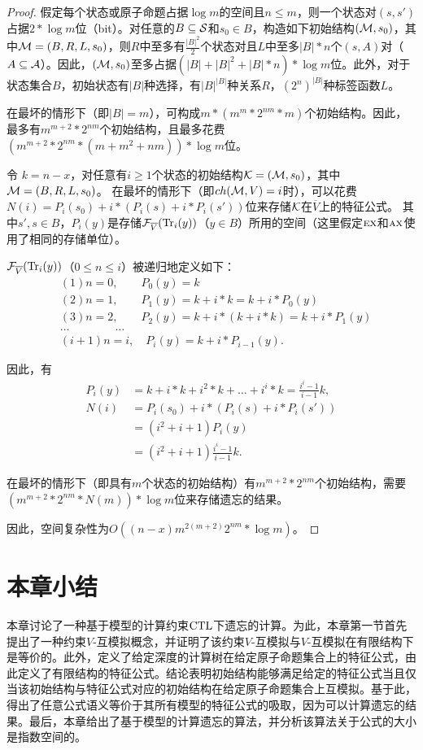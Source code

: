 \begin{proof}
假定每个状态或原子命题占据$\log m$的空间且$n\leq m$，则一个状态对$(s,s')$占据$2*\log m$位（bit）。对任意的$B \subseteq {\cal S}$和$s_0\in B$，构造如下初始结构$({\cal M},s_0)$，其中${\cal M} = (B,R,L,s_0)$，则$R$中至多有$\frac{|B|^2}{2}$个状态对且$L$中至多$|B|*n$个$(s,A)$对（$A\subseteq {\cal A}$）。因此，$({\cal M},s_0)$至多占据$(|B|+|B|^2+|B|*n)*\log m$位。此外，对于状态集合$B$，初始状态有$|B|$种选择，有$|B|^{|B|}$种关系$R$，$(2^n)^{|B|}$种标签函数$L$。

在最坏的情形下（即$|B|=m$），可构成$m * (m^m * 2^{nm} * m)$个初始结构。因此，最多有$m^{m+2} * 2^{nm}$个初始结构，且最多花费$(m^{m+2} * 2^{nm} * (m + m^2 + nm))* \log m$位。

令 $k = n-x$，对任意有$i\geq 1$个状态的初始结构${\cal K} = ({\cal M},s_0)$，其中${\cal M} = (B,R,L,s_0)$。
在最坏的情形下（即$ch({\cal M},V) = i$时），可以花费$N(i) = P_i(s_0) + i * (P_i(s) + i *P_i(s'))$位来存储${\cal K}$在$\overline{V}$上的特征公式。
其中$s',s\in B$，$P_i(y)$是存储${\cal F}_{\overline{V}}(\textrm{Tr}_i(y))$（$y\in B$）所用的空间（这里假定$\textsc{e}\textsc{x}$和$\textsc{a}\textsc{x}$使用了相同的存储单位）。

${\cal F}_{\overline{V}}(\textrm{Tr}_i(y))$（$0\leq n \leq i$）被递归地定义如下：
\begin{align*}
	&(1) n=0,  \qquad P_0(y) = k\\
	&(2) n=1, \qquad  P_1(y) = k + i*k = k + i*P_0(y)\\
	&(3) n=2, \qquad P_2(y) = k + i*(k + i*k) = k+i*P_1(y)\\
	& \dots \qquad \qquad \dots\\
	&(i+1) n = i, \quad P_i(y) = k + i * P_{i-1}(y).
\end{align*}

因此，有
\begin{align*}
	P_i(y) & = k + i*k + i^2 * k + \dots + i^i * k = \frac{i^i -1}{i-1} k,\\
	N(i) & = P_i(s_0) + i* (P_i(s) + i * P_i(s'))\\
	& = (i^2 + i +1) P_i(y) \\
	& = (i^2 + i+1)\frac{i^i -1}{i-1} k.
\end{align*}
	
在最坏的情形下（即具有$m$个状态的初始结构）有$m^{m+2} * 2^{nm}$个初始结构，需要$(m^{m+2} * 2^{nm} * N(m)) * \log m$位来存储遗忘的结果。

因此，空间复杂性为$O((n-x)m^{2(m+2)}2^{nm}* \log m)$。
\end{proof}


\section{本章小结}\label{sec:chapter05-conclusion}
本章讨论了一种基于模型的计算约束$\textrm{CTL}$下遗忘的计算。为此，本章第一节首先提出了一种约束$V$-互模拟概念，并证明了该约束$V$-互模拟与$V$-互模拟在有限结构下是等价的。此外，定义了给定深度的计算树在给定原子命题集合上的特征公式，由此定义了有限结构的特征公式。结论表明初始结构能够满足给定的特征公式当且仅当该初始结构与特征公式对应的初始结构在给定原子命题集合上互模拟。基于此，得出了任意公式语义等价于其所有模型的特征公式的吸取，因为可以计算遗忘的结果。最后，本章给出了基于模型的计算遗忘的算法，并分析该算法关于公式的大小是指数空间的。

